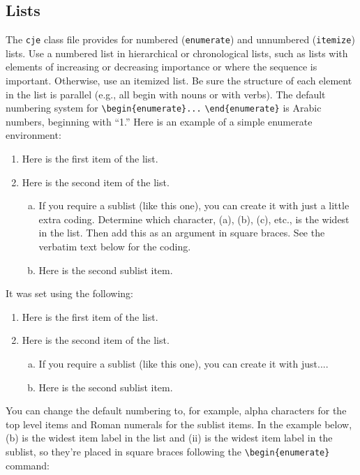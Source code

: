 \documentclass{cje}          %
\theoremstyle{plain}%
\theoremstyle{definition}
\theoremstyle{remark}
\begin{document}
\subsection{Lists}
The \texttt{cje} class file provides for numbered (\verb"enumerate") and unnumbered (\verb"itemize") lists. Use a numbered list in hierarchical or chronological lists, such as lists with elements of increasing or decreasing importance or where the sequence is important. Otherwise, use an itemized list. Be sure the structure of each element in the list is parallel (e.g., all begin with nouns or with verbs). The default numbering system for \verb"\begin{enumerate}..." \verb"\end{enumerate}" is Arabic numbers, beginning with ``1.'' Here is an example of a simple enumerate environment:
\begin{enumerate}
\item Here is the first item of the list.
\item Here is the second item of the list.
  \begin{enumerate}[(b)]
    \item If you require a sublist (like this one), you can create it with just a little extra coding. Determine which character, (a), (b), (c), etc., is the widest in the list. Then add this as an argument in square braces. See the verbatim text below for the coding.
    \item Here is the second sublist item.
  \end{enumerate}
\end{enumerate}
It was set using the following:
\begin{smallverbatim}
\begin{enumerate}
\item Here is the first item of the list.
\item Here is the second item of the list.
  \begin{enumerate}[(b)]
    \item If you require a sublist (like this one), you can create it with just....
    \item Here is the second sublist item.
  \end{enumerate}
\end{enumerate}
\end{smallverbatim}
%
You can change the default numbering to, for example, alpha characters for the top level items and Roman numerals for the sublist items. In the example below, (b) is the widest item label in the list and (ii) is the widest item label in the sublist, so they're placed in square braces following the \verb"\begin{enumerate}" command: 
\end{document}
